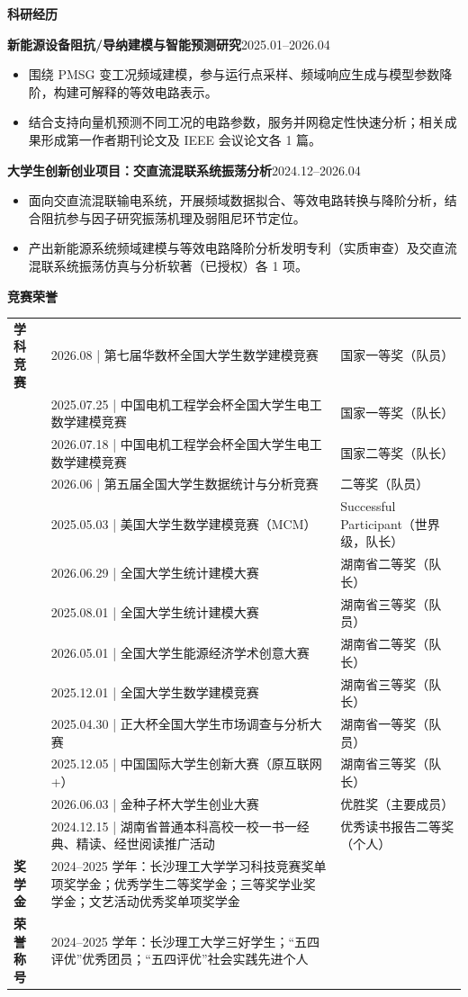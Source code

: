 \documentclass[UTF8,a4paper,10pt]{ctexart}
\newcommand{\sectiontitle}[1]{%
  \par\vspace{0.48em}
  {\sffamily\bfseries\fontsize{12.5pt}{15pt}\selectfont\color{resumeblue}#1}\par\nobreak
  \vspace{-0.1em}{\color{softline}\rule{\linewidth}{0.55pt}}\par\nobreak\vspace{0.12em}
}
\newcommand{\entryhead}[3]{{\sffamily\bfseries\color{resumeblue}#1}\hfill {\color{textgray}#2}\quad {\small\color{textgray}#3}\par\nobreak}
\begin{document}
\sectiontitle{科研经历}
\entryhead{新能源设备阻抗/导纳建模与智能预测研究}{2025.01--2026.04}{第一作者论文方向}
\begin{itemize}
  \item 围绕 PMSG 变工况频域建模，参与运行点采样、频域响应生成与模型参数降阶，构建可解释的等效电路表示。
  \item 结合支持向量机预测不同工况的电路参数，服务并网稳定性快速分析；相关成果形成第一作者期刊论文及 IEEE 会议论文各 1 篇。
\end{itemize}
\vspace{0.22em}
\entryhead{大学生创新创业项目：交直流混联系统振荡分析}{2024.12--2026.04}{已结题}
\begin{itemize}
  \item 面向交直流混联输电系统，开展频域数据拟合、等效电路转换与降阶分析，结合阻抗参与因子研究振荡机理及弱阻尼环节定位。
  \item 产出新能源系统频域建模与等效电路降阶分析发明专利（实质审查）及交直流混联系统振荡仿真与分析软著（已授权）各 1 项。
\end{itemize}

\newpage
\sectiontitle{竞赛荣誉}
\begin{tabularx}{\linewidth}{L{2.25cm}L{10.95cm}Y}
\textbf{学科竞赛} & 2026.08 | 第七届华数杯全国大学生数学建模竞赛 & 国家一等奖（队员）\\
 & 2025.07.25 | 中国电机工程学会杯全国大学生电工数学建模竞赛 & 国家一等奖（队长）\\
 & 2026.07.18 | 中国电机工程学会杯全国大学生电工数学建模竞赛 & 国家二等奖（队长）\\
 & 2026.06 | 第五届全国大学生数据统计与分析竞赛 & 二等奖（队员）\\
 & 2025.05.03 | 美国大学生数学建模竞赛（MCM） & Successful Participant（世界级，队长）\\
 & 2026.06.29 | 全国大学生统计建模大赛 & 湖南省二等奖（队长）\\
 & 2025.08.01 | 全国大学生统计建模大赛 & 湖南省三等奖（队员）\\
 & 2026.05.01 | 全国大学生能源经济学术创意大赛 & 湖南省二等奖（队长）\\
 & 2025.12.01 | 全国大学生数学建模竞赛 & 湖南省三等奖（队长）\\
 & 2025.04.30 | 正大杯全国大学生市场调查与分析大赛 & 湖南省一等奖（队员）\\
 & 2025.12.05 | 中国国际大学生创新大赛（原互联网+） & 湖南省三等奖（队长）\\
 & 2026.06.03 | 金种子杯大学生创业大赛 & 优胜奖（主要成员）\\
 & 2024.12.15 | 湖南省普通本科高校一校一书一经典、精读、经世阅读推广活动 & 优秀读书报告二等奖（个人）\\[0.12em]
\textbf{奖学金} & 2024--2025 学年：长沙理工大学学习科技竞赛奖单项奖学金；优秀学生二等奖学金；三等奖学业奖学金；文艺活动优秀奖单项奖学金 & \\
\textbf{荣誉称号} & 2024--2025 学年：长沙理工大学三好学生；“五四评优”优秀团员；“五四评优”社会实践先进个人 & \\
\end{tabularx}
\end{document}

